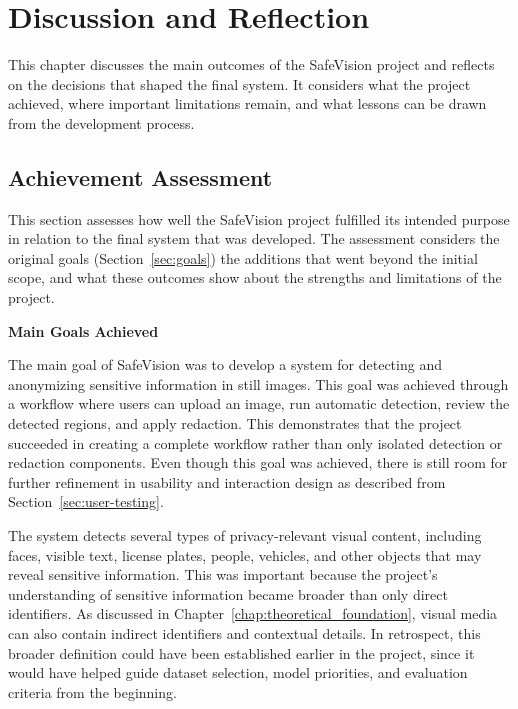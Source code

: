 \chapter{Discussion and Reflection}
\label{chap:dar}

This chapter discusses the main outcomes of the \gls{SafeVision} project and reflects on the decisions that shaped the final system. It considers what the project achieved, where important limitations remain, and what lessons can be drawn from the development process. 


\section{Achievement Assessment}

This section assesses how well the \gls{SafeVision} project fulfilled its intended purpose in relation to the final system that was developed. The assessment considers the original goals (Section~\ref{sec:goals}) the additions that went beyond the initial scope, and what these outcomes show about the strengths and limitations of the project.

\noindent\textbf{Main Goals Achieved}

The main goal of \gls{SafeVision} was to develop a system for detecting and anonymizing sensitive information in still images. This goal was achieved through a workflow where users can upload an image, run automatic detection, review the detected regions, and apply redaction. This demonstrates that the project succeeded in creating a complete workflow rather than only isolated detection or redaction components. Even though this goal was achieved, there is still room for further refinement in usability and interaction design as described from Section~\ref{sec:user-testing}.

The system detects several types of privacy-relevant visual content, including faces, visible text, license plates, people, vehicles, and other objects that may reveal sensitive information. This was important because the project’s understanding of sensitive information became broader than only direct identifiers. As discussed in Chapter~\ref{chap:theoretical_foundation}, visual media can also contain indirect identifiers and contextual details. In retrospect, this broader definition could have been established earlier in the project, since it would have helped guide dataset selection, model priorities, and evaluation criteria from the beginning.

